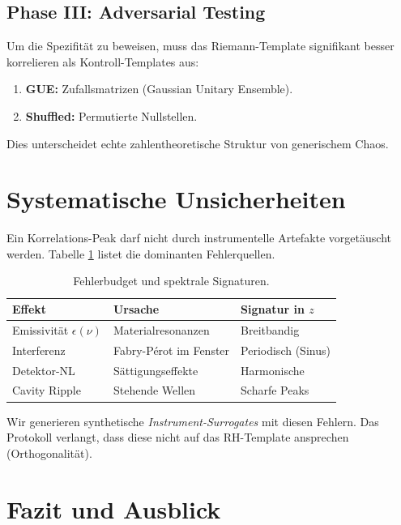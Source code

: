 \documentclass[11pt, a4paper]{article}
\begin{document}
	\subsection{Phase III: Adversarial Testing}
	Um die Spezifität zu beweisen, muss das Riemann-Template signifikant besser korrelieren als Kontroll-Templates aus:
	\begin{enumerate}
		\item \textbf{GUE:} Zufallsmatrizen (Gaussian Unitary Ensemble).
		\item \textbf{Shuffled:} Permutierte Nullstellen.
	\end{enumerate}
	Dies unterscheidet echte zahlentheoretische Struktur von generischem Chaos.
	
	\section{Systematische Unsicherheiten}
	
	Ein Korrelations-Peak darf nicht durch instrumentelle Artefakte vorgetäuscht werden. Tabelle \ref{tab:error} listet die dominanten Fehlerquellen.
	
	\begin{table}[ht]
		\centering
		\caption{Fehlerbudget und spektrale Signaturen.}
		\label{tab:error}
		\begin{tabular}{@{}lp{6cm}l@{}}
			\toprule
			\textbf{Effekt} & \textbf{Ursache} & \textbf{Signatur in $z$} \\ \midrule
			Emissivität $\epsilon(\nu)$ & Materialresonanzen & Breitbandig \\
			Interferenz & Fabry-Pérot im Fenster & Periodisch (Sinus) \\
			Detektor-NL & Sättigungseffekte & Harmonische \\
			Cavity Ripple & Stehende Wellen & Scharfe Peaks \\
			\bottomrule
		\end{tabular}
	\end{table}
	
	Wir generieren synthetische \textit{Instrument-Surrogates} mit diesen Fehlern. Das Protokoll verlangt, dass diese nicht auf das RH-Template ansprechen (Orthogonalität).
	
	\section{Fazit und Ausblick}
	
\end{document}

